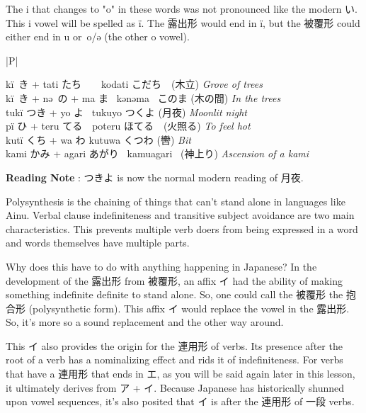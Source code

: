 \par{ The i that changes to "o" in these words was not pronounced like the modern い. This i vowel will be spelled as ï. The 露出形 would end in ï, but the 被覆形 could either end in u or o\slash ə (the other o vowel). }

\begin{ltabulary}{|P|}
\hline 

kï き + tati たち　\textrightarrow 　kodati こだち　(木立)  \emph{Grove of trees }\\

kï き + nə の + ma ま \textrightarrow  kənəma  このま (木の間) \emph{In the trees }\hfill\break
\\

tukï つき + yo よ \textrightarrow  tukuyo つくよ (月夜) \emph{Moonlit night }\hfill\break
\\

pï ひ + teru てる　\textrightarrow  poteru ほてる　(火照る)  \emph{To feel hot }\\

kutï くち + wa わ \textrightarrow  kutuwa くつわ (轡) \emph{Bit }\\

kami かみ + agari あがり \textrightarrow   kamuagari  (神上り) \emph{Ascension of a kami }\\

\end{ltabulary}

\par{\textbf{Reading Note }: つきよ is now the normal modern reading of 月夜. }

\par{ Polysynthesis is the chaining of things that can't stand alone in languages like Ainu. Verbal clause indefiniteness and transitive subject avoidance are two main characteristics. This prevents multiple verb doers from being expressed in a word and words themselves have multiple parts. }

\par{ Why does this have to do with anything happening in Japanese? In the development of the 露出形 from 被覆形, an affix イ had the ability of making something indefinite definite to stand alone. So, one could call the 被覆形 the 抱合形 (polysynthetic form). This affix イ would replace the vowel in the 露出形. So, it's more so a sound replacement and the other way around. }

\par{ This イ also provides the origin for the 連用形 of verbs. Its presence after the root of a verb has a nominalizing effect and rids it of indefiniteness. For verbs that have a 連用形 that ends in エ, as you will be said again later in this lesson, it ultimately derives from ア + イ. Because Japanese has historically shunned upon vowel sequences, it's also posited that イ is after the 連用形 of 一段 verbs. }

